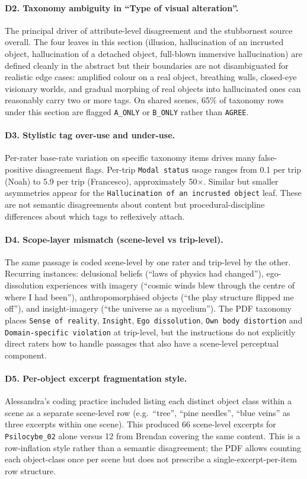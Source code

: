 \paragraph{D2. Taxonomy ambiguity in ``Type of visual alteration''.}
The principal driver of attribute-level disagreement and the stubbornest source overall. The four leaves in this section (illusion, hallucination of an incrusted object, hallucination of a detached object, full-blown immersive hallucination) are defined cleanly in the abstract but their boundaries are not disambiguated for realistic edge cases: amplified colour on a real object, breathing walls, closed-eye visionary worlds, and gradual morphing of real objects into hallucinated ones can reasonably carry two or more tags. On shared scenes, 65\% of taxonomy rows under this section are flagged \texttt{A\_ONLY} or \texttt{B\_ONLY} rather than \texttt{AGREE}.

\paragraph{D3. Stylistic tag over-use and under-use.}
Per-rater base-rate variation on specific taxonomy items drives many false-positive disagreement flags. Per-trip \texttt{Modal status} usage ranges from 0.1 per trip (Noah) to 5.9 per trip (Francesco), approximately 50$\times$. Similar but smaller asymmetries appear for the \texttt{Hallucination of an incrusted object} leaf. These are not semantic disagreements about content but procedural-discipline differences about which tags to reflexively attach.

\paragraph{D4. Scope-layer mismatch (scene-level vs trip-level).}
The same passage is coded scene-level by one rater and trip-level by the other. Recurring instances: delusional beliefs (``laws of physics had changed''), ego-dissolution experiences with imagery (``cosmic winds blew through the centre of where I had been''), anthropomorphised objects (``the play structure flipped me off''), and insight-imagery (``the universe as a mycelium''). The PDF taxonomy places \texttt{Sense of reality}, \texttt{Insight}, \texttt{Ego dissolution}, \texttt{Own body distortion} and \texttt{Domain-specific violation} at trip-level, but the instructions do not explicitly direct raters how to handle passages that also have a scene-level perceptual component.

\paragraph{D5. Per-object excerpt fragmentation style.}
Alessandra's coding practice included listing each distinct object class within a scene as a separate scene-level row (e.g.\ ``tree'', ``pine needles'', ``blue veins'' as three excerpts within one scene). This produced 66 scene-level excerpts for \texttt{Psilocybe\_02} alone versus 12 from Brendan covering the same content. This is a row-inflation style rather than a semantic disagreement; the PDF allows counting each object-class once per scene but does not prescribe a single-excerpt-per-item row structure.

